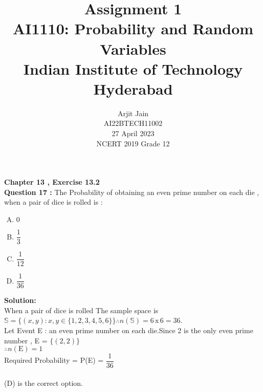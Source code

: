 \documentclass[journal,12pt,twocolumn]{IEEEtran}
\title{Assignment 1 \\ \Large AI1110: Probability and Random Variables \\ \large Indian Institute of Technology Hyderabad}
\author{Arjit Jain \\ \normalsize AI22BTECH11002 \\ \vspace*{20pt} \normalsize  27 April 2023 \\ \vspace*{20pt} \Large NCERT 2019 Grade 12}
\begin{document}
\maketitle

\large

\textbf{Chapter 13 , Exercise 13.2 }\\[6pt]
\textbf{Question 17 :}
The Probability of obtaining an even prime number on each die , when a pair of dice is rolled is :\\
\begin{enumerate}[(A)]
    \item $0$ \vspace{0.5cm}
    \item $\dfrac{1}{3}$ \vspace{0.5cm}
    \item $\dfrac{1}{12}$  \vspace{0.5cm}
    \item $\dfrac{1}{36}$
\end{enumerate}

\vspace{1cm}

\textbf{Solution:} \\[6pt]
When a pair of dice is rolled The sample space is $\mathbb{S}=\{(x,y) : x,y \in \{ 1,2,3,4,5,6\}\} \therefore n(\mathbb{S})=6 \,\text{x}\, 6 = 36$.\\
Let Event E : an even prime number on each die.Since 2 is the only even prime number , E = $\{(2,2)\}$ \\
$\therefore n(\text{E})=1$\\
Required Probability = P(E) = $\dfrac{1}{36}$\\
\\
(D) is the correct option.
\end{document}
